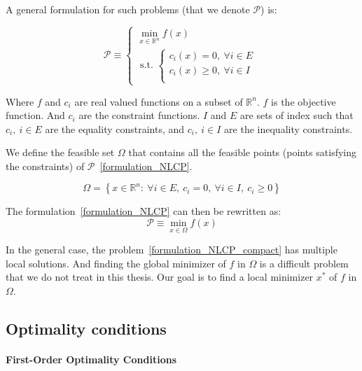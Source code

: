 A general formulation for such problems (that we denote $\mathcal{P}$) is:

\begin{equation}
  \label{formulation_NLCP}
  \mathcal{P} \equiv
  \left\{
  \begin{array}{l}
    \min\limits_{x\in\mathbb{R}^n}{f(x)}\\
    \text{ s.t. }
    \left\{
    \begin{array}{l}
      c_i(x) = 0,\ \forall i\in{E}\\
      c_i(x) \geq 0,\ \forall i\in{I}\\
    \end{array}
    \right.
  \end{array}
  \right.
\end{equation}

Where $f$ and $c_i$ are real valued functions on a subset of $\mathbb{R}^n$.
$f$ is the objective function. And $c_i$ are the constraint functions.
${I}$ and ${E}$ are sets of index such that $c_i,\ i\in{E}$ are the equality constraints, and $c_i,\ i\in{I}$ are the inequality constraints.

We define the feasible set $\Omega$ that contains all the feasible points (points satisfying the constraints) of $\mathcal{P}$~\ref{formulation_NLCP}.

\begin{equation}
  \Omega = \left\{ x\in \mathbb{R}^n:\ \forall i\in {E},\ c_i=0,\ \forall i\in{I},\ c_i \geq0\right\}
\end{equation}

The formulation~\ref{formulation_NLCP} can then be rewritten as:
\begin{equation}
  \label{formulation_NLCP_compact}
  \mathcal{P} \equiv \min_{x\in\Omega}{f(x)}
\end{equation}

In the general case, the problem~\ref{formulation_NLCP_compact} has multiple local solutions.
And finding the global minimizer of $f$ in $\Omega$ is a difficult problem that we do not treat in this thesis.
Our goal is to find a local minimizer $x^*$ of $f$ in $\Omega$.

\subsection{Optimality conditions}
\label{sub:optimality_conditions}

\paragraph{First-Order Optimality Conditions}

